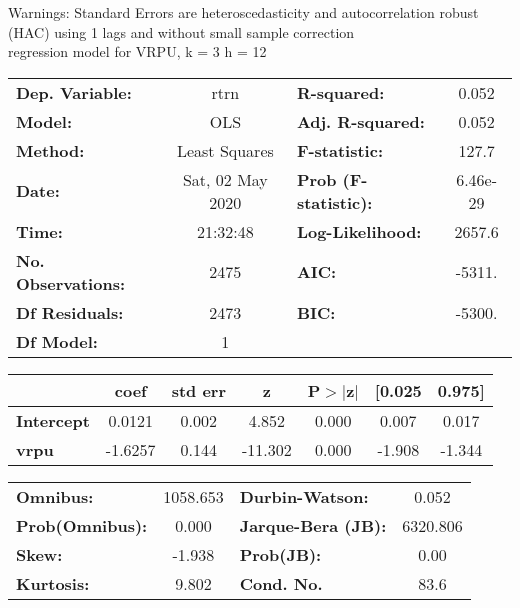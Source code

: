Warnings: \newline
 [1] Standard Errors are heteroscedasticity and autocorrelation robust (HAC) using 1 lags and without small sample correction\\ 

regression model for VRPU, k = 3 h = 12\begin{center}
\begin{tabular}{lclc}
\toprule
\textbf{Dep. Variable:}    &       rtrn       & \textbf{  R-squared:         } &     0.052   \\
\textbf{Model:}            &       OLS        & \textbf{  Adj. R-squared:    } &     0.052   \\
\textbf{Method:}           &  Least Squares   & \textbf{  F-statistic:       } &     127.7   \\
\textbf{Date:}             & Sat, 02 May 2020 & \textbf{  Prob (F-statistic):} &  6.46e-29   \\
\textbf{Time:}             &     21:32:48     & \textbf{  Log-Likelihood:    } &    2657.6   \\
\textbf{No. Observations:} &        2475      & \textbf{  AIC:               } &    -5311.   \\
\textbf{Df Residuals:}     &        2473      & \textbf{  BIC:               } &    -5300.   \\
\textbf{Df Model:}         &           1      & \textbf{                     } &             \\
\bottomrule
\end{tabular}
\begin{tabular}{lcccccc}
                   & \textbf{coef} & \textbf{std err} & \textbf{z} & \textbf{P$> |$z$|$} & \textbf{[0.025} & \textbf{0.975]}  \\
\midrule
\textbf{Intercept} &       0.0121  &        0.002     &     4.852  &         0.000        &        0.007    &        0.017     \\
\textbf{vrpu}      &      -1.6257  &        0.144     &   -11.302  &         0.000        &       -1.908    &       -1.344     \\
\bottomrule
\end{tabular}
\begin{tabular}{lclc}
\textbf{Omnibus:}       & 1058.653 & \textbf{  Durbin-Watson:     } &    0.052  \\
\textbf{Prob(Omnibus):} &   0.000  & \textbf{  Jarque-Bera (JB):  } & 6320.806  \\
\textbf{Skew:}          &  -1.938  & \textbf{  Prob(JB):          } &     0.00  \\
\textbf{Kurtosis:}      &   9.802  & \textbf{  Cond. No.          } &     83.6  \\
\bottomrule
\end{tabular}
\end{center}

